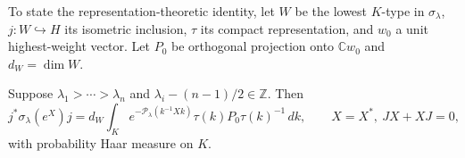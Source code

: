 To state the representation-theoretic identity,
let $W$ be the lowest $K$-type in $\sigma_\lambda$,
$j:W\hookrightarrow H$ its isometric inclusion, $\tau$ its
compact representation, and $w_0$ a unit highest-weight vector.
Let $P_0$ be orthogonal projection onto $\mathbb Cw_0$ and
$d_W=\dim W$.

\begin{theorem}\label{amb-compression}
Suppose
$\lambda_1>\cdots>\lambda_n$ and
$\lambda_i-(n-1)/2\in\mathbb Z$.
Then
\begin{equation}\label{amb-compression-input}
 j^*\sigma_\lambda(e^X)j
   =d_W\int_K e^{-\mathcal P_\lambda(k^{-1}Xk)}
                 \tau(k)P_0\tau(k)^{-1}\,dk ,
 \qquad X=X^*,\ JX+XJ=0,
\end{equation}
with probability Haar measure on $K$.
\end{theorem}
